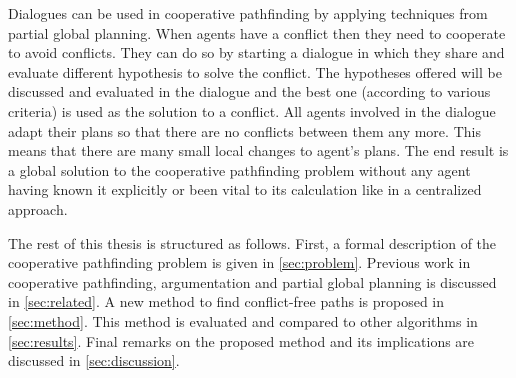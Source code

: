 Dialogues can be used in cooperative pathfinding by applying techniques from
partial global planning. When agents have a conflict then they need to
cooperate to avoid conflicts. They can do so by starting a dialogue in which
they share and evaluate different hypothesis to solve the conflict. The
hypotheses offered will be discussed and evaluated in the dialogue and the best
one (according to various criteria) is used as the solution to a conflict. All
agents involved in the dialogue adapt their plans so that there are no
conflicts between them any more. This means that there are many small local
changes to agent's plans. The end result is a global solution to the
cooperative pathfinding problem without any agent having known it explicitly or
been vital to its calculation like in a centralized approach.

The rest of this thesis is structured as follows. First, a formal description
of the cooperative pathfinding problem is given in \autoref{sec:problem}.
Previous work in cooperative pathfinding, argumentation and partial global
planning is discussed in \autoref{sec:related}. A new method to find
conflict-free paths is proposed in \autoref{sec:method}. This method is
evaluated and compared to other algorithms in \autoref{sec:results}. Final
remarks on the proposed method and its implications are discussed in
\autoref{sec:discussion}.
